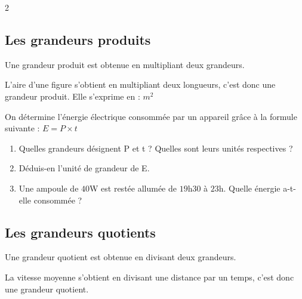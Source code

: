 \documentclass[a4paper,10pt]{report}
\begin{document}
\begin{multicols}{2}
\vspace{-2mm}
\subsection{Les grandeurs produits}

\begin{defn}
Une grandeur produit est obtenue en multipliant deux grandeurs.
\end{defn}

\begin{ex}
L'aire d'une figure s'obtient en multipliant deux longueurs, c'est donc une grandeur produit. Elle s'exprime en : $ m ^2$
\end{ex}

\vspace{-2mm}
\begin{meth}
On détermine l'énergie électrique consommée par un appareil grâce à la formule suivante :		\quad $E = P \times t$
\begin{enumerate}
\item Quelles grandeurs désignent P et t ? Quelles sont leurs unités respectives ?

\medskip
\noindent\grandscarreaux{\linewidth}{0.55cm}

\item Déduis-en l'unité de grandeur de E.

\medskip
\noindent\grandscarreaux{\linewidth}{0.55cm}
\item Une ampoule de $40$W est restée allumée de $19$h$30$ à $23$h. Quelle énergie a-t-elle consommée ?

\medskip
\noindent\grandscarreaux{\linewidth}{1.25cm}
\end{enumerate}
\end{meth}

\vspace{-2mm}
\subsection{Les grandeurs quotients}

\vspace{-2mm}
\begin{defn}
Une grandeur quotient est obtenue en divisant deux grandeurs.
\end{defn}

\begin{ex}
La vitesse moyenne s'obtient en divisant une distance par un temps, c'est donc une grandeur quotient. 


\end{ex}
\end{multicols}
\end{document}
